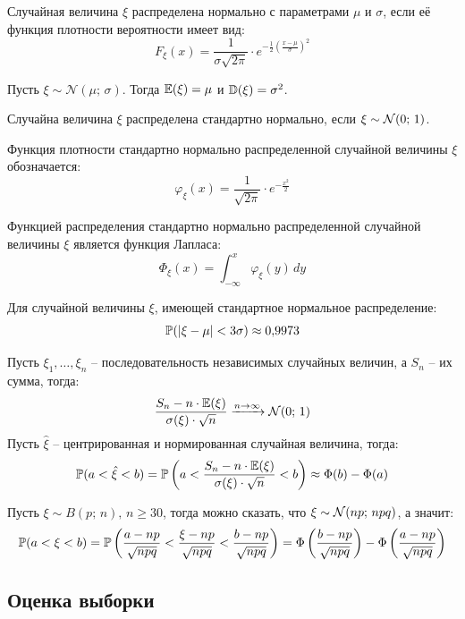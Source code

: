 \documentclass[12pt]{article}
\begin{document}
\begin{definition}
    Случайная величина $\xi$ распределена нормально с параметрами $\mu$ и $\sigma$, если её функция плотности вероятности имеет вид:
    $$F_\xi(x)=\frac{1}{\sigma\sqrt{2\pi}}\cdot e^{-\frac{1}{2}\left(\frac{x-\mu}{\sigma}\right)^2}$$
\end{definition}
\begin{theorem}
    Пусть $\xi\sim\mathcal{N}(\mu;\,\sigma)$. Тогда $\mathbb{E}(\xi)=\mu$ и $\mathbb{D}(\xi)=\sigma^2$.
\end{theorem}
\begin{definition}
    Случайна величина $\xi$ распределена стандартно нормально, если $\xi\sim\mathcal{N}(0;\,1)$.
\end{definition}
\begin{definition}
    Функция плотности стандартно нормально распределенной случайной величины $\xi$ обозначается:
    $$\varphi_\xi(x)=\frac{1}{\sqrt{2\pi}}\cdot e^{-\frac{x^2}{2}}$$
\end{definition}
\begin{theorem}
    Функцией распределения стандартно нормально распределенной случайной величины $\xi$ является функция Лапласа:
    $$\Phi_\xi(x)=\int_{-\infty}^{x}\varphi_\xi(y)\, dy $$
\end{theorem}
\begin{theorem}
    Для случайной величины $\xi$, имеющей стандартное нормальное распределение:
    $$\mathbb{P}(|\xi-\mu|<3\sigma)\approx\num{0.9973}$$
\end{theorem}
\begin{theorem}
    Пусть $\xi_1,\ldots,\xi_n$ – последовательность независимых случайных величин, а $S_n$ – их сумма, тогда:
    $$\frac{S_n-n\cdot \mathbb{E}(\xi)}{\sigma(\xi)\cdot\sqrt{n}}\xrightarrow{n\to\infty}\mathcal{N}(0;\,1)$$
    Пусть $\hat{\xi}$ – центрированная и нормированная случайная величина, тогда: 
    $$\mathbb{P}(a<\hat{\xi}<b)=\mathbb{P}\left(a<\frac{S_n-n\cdot \mathbb{E}(\xi)}{\sigma(\xi)\cdot\sqrt{n}}<b\right)\approx\Phi(b)-\Phi(a)$$
\end{theorem}
\begin{theorem}
    Пусть $\xi\sim B(p;\,n),\,n\geq30$, тогда можно сказать, что $\xi\sim\mathcal{N}(np;\,npq)$, а значит:
    $$\mathbb{P}(a<\xi<b)=\mathbb{P}\left(\frac{a-np}{\sqrt{npq}}<\frac{\xi-np}{\sqrt{npq}}<\frac{b-np}{\sqrt{npq}}\right)=\Phi\left(\frac{b-np}{\sqrt{npq}}\right)-\Phi\left(\frac{a-np}{\sqrt{npq}}\right)$$
\end{theorem}

\subsection{Оценка выборки}
\end{document}
